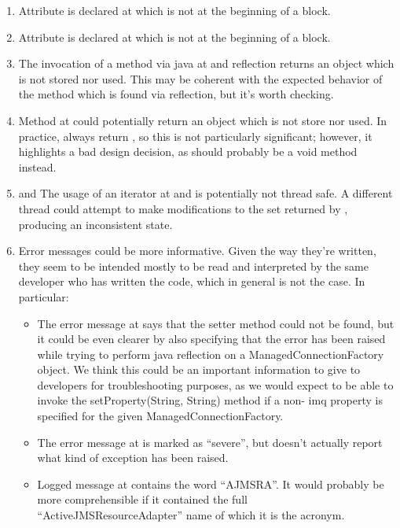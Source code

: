 \begin{enumerate}
	\item {} Attribute  is declared at  which is not at the beginning of a block.
	\item {} Attribute  is declared at  which is not at the beginning of a block.
	\item {} The invocation of a method via java at  and  reflection returns an  object which is not stored nor used. This may be coherent with the expected behavior of the  method which is found via reflection, but it's worth checking. 
	\item {} Method  at  could potentially return an  object which is not store nor used. In practice,  always return , so this is not particularly significant; however, it highlights a bad design decision, as  should probably be a void method instead. 
	\item {} and  The usage of an iterator at  and  is potentially not thread safe. A different thread could attempt to make modifications to the set returned by , producing an inconsistent state. 
	\item {} Error messages could be more informative. Given the way they're written, they seem to be intended mostly to be read and interpreted by the same developer who has written the code, which in general is not the case. In particular:
		\begin{itemize}
			\item The error message at  says that the setter method could not be found, but it could be even clearer by also specifying that the error has been raised while trying to perform java reflection on a ManagedConnectionFactory object. We think this could be an important information to give to developers for troubleshooting purposes, as we would expect to be able to invoke the setProperty(String, String) method if a non- imq property is specified for the given ManagedConnectionFactory. 
			\item The error message at  is marked as “severe”, but doesn't actually report what kind of exception has been raised. 
			\item Logged message at  contains the word “AJMSRA”. It would probably be more comprehensible if it contained the full “ActiveJMSResourceAdapter” name of which it is the acronym. 

\end{itemize}
\end{enumerate}
